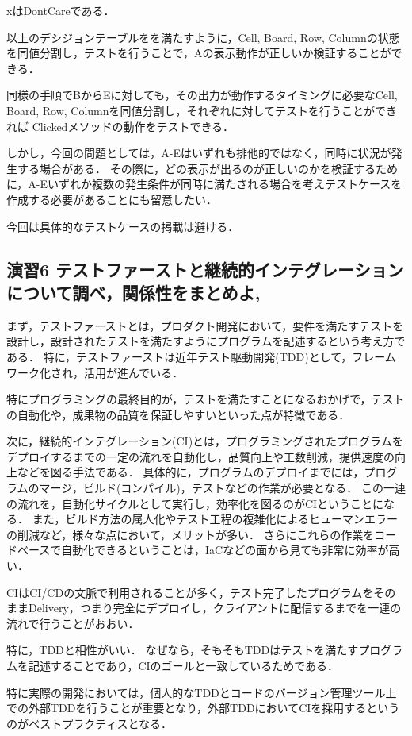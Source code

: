 \documentclass[platex,dvipdfmx,12pt]{jsarticle}
\begin{document}
xはDontCareである．

以上のデシジョンテーブルをを満たすように，Cell, Board, Row, Columnの状態を同値分割し，テストを行うことで，Aの表示動作が正しいか検証することができる．

同様の手順でBからEに対しても，その出力が動作するタイミングに必要なCell, Board, Row, Columnを同値分割し，それぞれに対してテストを行うことができれば
Clickedメソッドの動作をテストできる．

しかし，今回の問題としては，A-Eはいずれも排他的ではなく，同時に状況が発生する場合がある．
その際に，どの表示が出るのが正しいのかを検証するために，A-Eいずれか複数の発生条件が同時に満たされる場合を考えテストケースを作成する必要があることにも留意したい．

今回は具体的なテストケースの掲載は避ける．

\newpage
\subsection{演習6 テストファーストと継続的インテグレーションについて調べ，関係性をまとめよ\cite{wiki:aws-cicd-definition}, \cite{wiki:tdd}}
まず，テストファーストとは，プロダクト開発において，要件を満たすテストを設計し，設計されたテストを満たすようにプログラムを記述するという考え方である．
特に，テストファーストは近年テスト駆動開発(TDD)として，フレームワーク化され，活用が進んでいる．

特にプログラミングの最終目的が，テストを満たすことになるおかげで，テストの自動化や，成果物の品質を保証しやすいといった点が特徴である．

次に，継続的インテグレーション(CI)とは，プログラミングされたプログラムをデプロイするまでの一定の流れを自動化し，品質向上や工数削減，提供速度の向上などを図る手法である．
具体的に，プログラムのデプロイまでには，プログラムのマージ，ビルド(コンパイル)，テストなどの作業が必要となる．
この一連の流れを，自動化サイクルとして実行し，効率化を図るのがCIということになる．
また，ビルド方法の属人化やテスト工程の複雑化によるヒューマンエラーの削減など，様々な点において，メリットが多い．
さらにこれらの作業をコードベースで自動化できるということは，IaCなどの面から見ても非常に効率が高い．

CIはCI/CDの文脈で利用されることが多く，テスト完了したプログラムをそのままDelivery，つまり完全にデプロイし，クライアントに配信するまでを一連の流れで行うことがおおい．

特に，TDDと相性がいい．
なぜなら，そもそもTDDはテストを満たすプログラムを記述することであり，CIのゴールと一致しているためである．

特に実際の開発においては，個人的なTDDとコードのバージョン管理ツール上での外部TDDを行うことが重要となり，外部TDDにおいてCIを採用するというのがベストプラクティスとなる．



\end{document}
